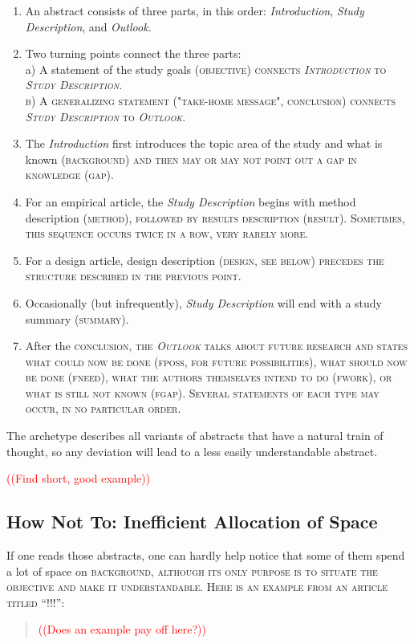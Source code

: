 \documentclass[10pt,journal,compsoc]{IEEEtran}
\newcommand{\Cb}[1]{\bgroup\scshape #1\egroup}  %
\newcommand{\Todo}[1]{\textcolor{red}{\sffamily ((#1))}}
\begin{document}
\begin{enumerate}
\item An abstract consists of three parts, in this order:
   \emph{Introduction}, \emph{Study Description}, and \emph{Outlook}.
\item Two turning points connect the three parts:\\
   a) A statement of the study goals (\Cb{objective}) connects \emph{Introduction}
      to \emph{Study Description}.\\
   b) A generalizing statement ("take-home message", \Cb{conclusion})
     connects \emph{Study Description} to \emph{Outlook}.
\item The \emph{Introduction} first introduces the topic area of the study and what is known (\Cb{background})
   and then may or may not point out a gap in knowledge (\Cb{gap}).
\item For an empirical article, the \emph{Study Description} begins with
   method description (\Cb{method}), followed by results description (\Cb{result}).
   Sometimes, this sequence occurs twice in a row, very rarely more.
\item For a design article, design description (\Cb{design}, see below) precedes the structure
   described in the previous point.
\item Occasionally (but infrequently), \emph{Study Description} will end with a study summary (\Cb{summary}).
\item After the \Cb{conclusion}, the \emph{Outlook} talks about future research and states
   what could now be done (\Cb{fposs}, for future possibilities),
   what should now be done (\Cb{fneed}),
   what the authors themselves intend to do (\Cb{fwork}), or
   what is still not known (\Cb{fgap}).
   Several statements of each type may occur, in no particular order.
\end{enumerate}

The archetype describes all variants of abstracts that have a natural train of thought,
so any deviation will lead to a less easily understandable abstract.

\Todo{Find short, good example}


\subsection{How Not To: Inefficient Allocation of Space}\label{inefficient_allocation}

If one reads those abstracts, one can hardly help notice that some of them 
spend a lot of space on \Cb{background}, although its only purpose is to situate
the objective and make it understandable.
Here is an example from an article titled
``!!!'':
\begin{quote}
  \Todo{Does an example pay off here?}	
\end{quote}	
\end{document}
